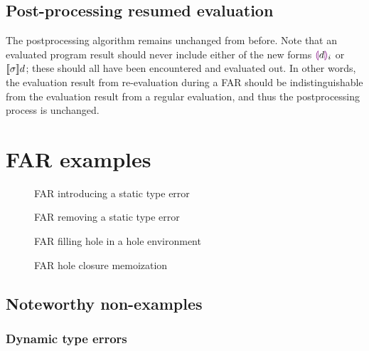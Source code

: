 \subsection{Post-processing resumed evaluation}
\label{sec:far-postprocessing}

The postprocessing algorithm remains unchanged from before. Note that an evaluated program result should never include either of the new forms $\textcolor{violet}{\llparenthesis} d\textcolor{violet}{\rrparenthesis}_i$ or $\llbracket\sigma\rrbracket d$; these should all have been encountered and evaluated out. In other words, the evaluation result from re-evaluation during a FAR should be indistinguishable from the evaluation result from a regular evaluation, and thus the postprocessing process is unchanged.


\section{FAR examples}
\label{sec:far-examples}


\begin{figure}
  \centering
  \caption{FAR introducing a static type error}
  \label{fig:far-introduce-type-error}
\end{figure}

\begin{figure}
  \centering
  \caption{FAR removing a static type error}
  \label{fig:far-remove-type-error}
\end{figure}

\begin{figure}
  \centering
  \caption{FAR filling hole in a hole environment}
  \label{fig:far-fill-hole-in-hole-env}
\end{figure}

\begin{figure}
  \centering
  \caption{FAR hole closure memoization}
  \label{fig:far-hole-closure-memoization}
\end{figure}

\subsection{Noteworthy non-examples}
\label{sec:far-nonexamples}

\subsubsection{Dynamic type errors}
\label{sec:far-dynamic-type-errors}

